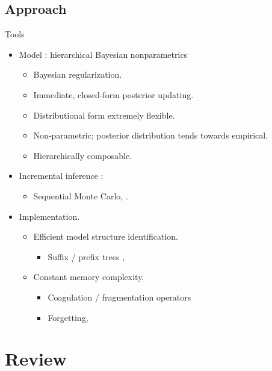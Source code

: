 \documentclass{beamer}
\begin{document}
\subsection{Approach}
\begin{frame}[t]{Tools}
\begin{itemize}
\item Model : hierarchical Bayesian nonparametrics \cite{Teh2006b}
\begin{itemize}
\item Bayesian regularization.
\item Immediate, closed-form posterior updating.
\item Distributional form extremely flexible.
\item Non-parametric; posterior distribution tends towards empirical. 
\item Hierarchically composable.
\end{itemize}
\item Incremental inference : \cite{Doucet2001,Liu2001,MacEachern1999}
\begin{itemize}
\item  Sequential Monte Carlo,  \citet{Wood2007,Wood2008,Wood2008b,Gasthaus2010}.
\end{itemize}
\item Implementation.
\begin{itemize}
\item Efficient model structure identification.
\begin{itemize}
\item Suffix / prefix trees  \cite{Ukkonen1995},\citet{Wood2009}
\end{itemize}

\item Constant memory complexity.
\begin{itemize}
\item Coagulation / fragmentation operators \cite{Pitman1999,Ho2006}
\item Forgetting, \citet{Bartlett2010}
\end{itemize}
\end{itemize}
\end{itemize}


\end{frame}	

\section{Review}
\end{document}
